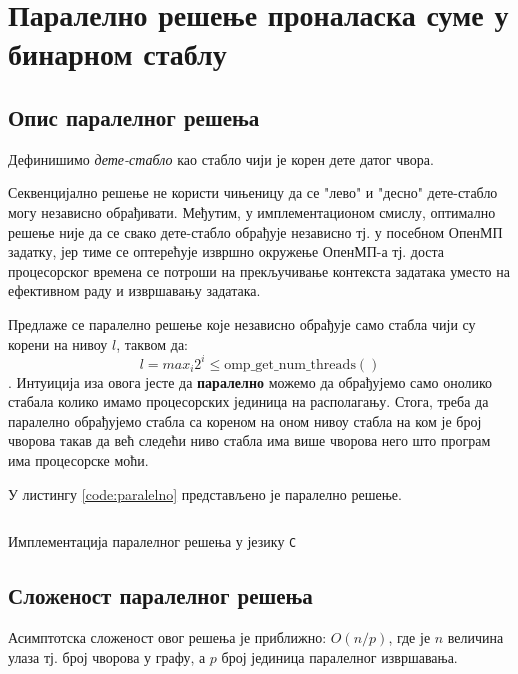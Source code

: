 \section{Паралелно решење проналаска суме у бинарном стаблу}

\subsection{Опис паралелног решења}
Дефинишимо \textit{дете-стабло} као стабло чији је корен дете датог чвора.

Секвенцијално решење не користи чињеницу да се "лево" и "десно" дете-стабло могу независно обрађивати.
Међутим, у имплементационом смислу, оптимално решење није да се свако дете-стабло обрађује независно тј.
у посебном ОпенМП задатку, јер тиме се оптерећује извршно окружење ОпенМП-а тј. доста процесорског времена
се потроши на прекључивање контекста задатака уместо на ефективном раду и извршавању задатака.

Предлаже се паралелно решење које независно обрађује само стабла чији су корени на нивоу $l$, таквом да: $$l = max_i 2^i \leq \mathrm{omp\_get\_num\_threads()}$$.
Интуиција иза овога јесте да \textbf{паралелно} можемо да обрађујемо само онолико стабала колико имамо процесорских јединица на располагању.
Стога, треба да паралелно обрађујемо стабла са кореном на оном нивоу стабла на ком је број чворова такав да већ следећи ниво стабла има више чворова него
што програм има процесорске моћи.

У листингу \ref{code:paralelno} представљено је паралелно решење.

\begin{listing}
\inputminted{c}{kodovi/parallel.c}
\caption{Имплементација паралелног решења у језику \texttt{C}}
\label{code:paralelno}
\end{listing}

\subsection{Сложеност паралелног решења}

Асимптотска сложеност овог решења је приближно: $O(n/p)$, где је $n$ величина улаза тј. број чворова у графу, а $p$ број јединица паралелног извршавања.

\pagebreak